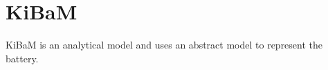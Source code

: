\section{KiBaM}\label{sec:kibam}
KiBaM is an analytical model and uses an abstract model to represent the battery.